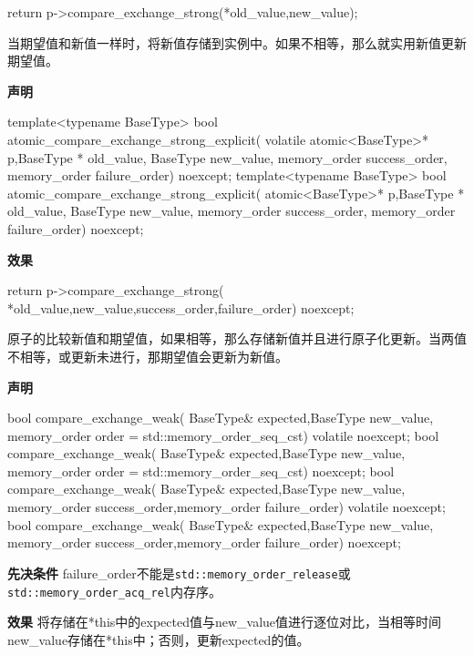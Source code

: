 \begin{cpp}
return p->compare_exchange_strong(*old_value,new_value);
\end{cpp}


当期望值和新值一样时，将新值存储到实例中。如果不相等，那么就实用新值更新期望值。

\textbf{声明}

\begin{cpp}
template<typename BaseType>
bool atomic_compare_exchange_strong_explicit(
    volatile atomic<BaseType>* p,BaseType * old_value,
    BaseType new_value, memory_order success_order,
    memory_order failure_order) noexcept;
template<typename BaseType>
bool atomic_compare_exchange_strong_explicit(
    atomic<BaseType>* p,BaseType * old_value,
    BaseType new_value, memory_order success_order,
    memory_order failure_order) noexcept;
\end{cpp}

\textbf{效果}

\begin{cpp}
return p->compare_exchange_strong(
    *old_value,new_value,success_order,failure_order) noexcept;
\end{cpp}


原子的比较新值和期望值，如果相等，那么存储新值并且进行原子化更新。当两值不相等，或更新未进行，那期望值会更新为新值。

\textbf{声明}

\begin{cpp}
bool compare_exchange_weak(
    BaseType& expected,BaseType new_value,
    memory_order order = std::memory_order_seq_cst) volatile noexcept;
bool compare_exchange_weak(
    BaseType& expected,BaseType new_value,
    memory_order order = std::memory_order_seq_cst) noexcept;
bool compare_exchange_weak(
    BaseType& expected,BaseType new_value,
    memory_order success_order,memory_order failure_order)
    volatile noexcept;
bool compare_exchange_weak(
    BaseType& expected,BaseType new_value,
    memory_order success_order,memory_order failure_order) noexcept;
\end{cpp}

\textbf{先决条件}
failure\_order不能是\texttt{std::memory\_order\_release}或\texttt{std::memory\_order\_acq\_rel}内存序。

\textbf{效果}
将存储在*this中的expected值与new\_value值进行逐位对比，当相等时间new\_value存储在*this中；否则，更新expected的值。

